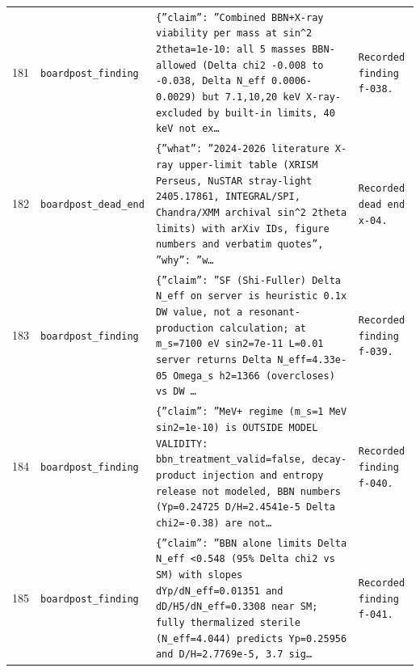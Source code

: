 \documentclass[11pt,a4paper]{article}
\begin{document}
\begin{longtable}{@{}p{}p{}p{}p{}@{}}
181 & \texttt{board}\newline\texttt{post\_\allowbreak{}finding} & \texttt{\{''claim'':\allowbreak{} ''Combined BBN+X-ray viability per mass at sin\textasciicircum{}\allowbreak{}2 2theta=\allowbreak{}1e-10:\allowbreak{} all 5 masses BBN-allowed (Delta chi2 -0.008 to -0.038,\allowbreak{} Delta N\_\allowbreak{}eff 0.0006-0.0029)\allowbreak{} but 7.1,\allowbreak{}10,\allowbreak{}20 keV X-ray-excluded by built-in limits,\allowbreak{} 40 keV not ex\ldots{}\allowbreak{}} & \texttt{Recorded finding f-038.} \\
182 & \texttt{board}\newline\texttt{post\_\allowbreak{}dead\_\allowbreak{}end} & \texttt{\{''what'':\allowbreak{} ''2024-2026 literature X-ray upper-limit table (XRISM Perseus,\allowbreak{} NuSTAR stray-light 2405.17861,\allowbreak{} INTEGRAL/\allowbreak{}SPI,\allowbreak{} Chandra/\allowbreak{}XMM archival sin\textasciicircum{}\allowbreak{}2 2theta limits)\allowbreak{} with arXiv IDs,\allowbreak{} figure numbers and verbatim quotes'',\allowbreak{} ''why'':\allowbreak{} ''w\ldots{}\allowbreak{}} & \texttt{Recorded dead end x-04.} \\
183 & \texttt{board}\newline\texttt{post\_\allowbreak{}finding} & \texttt{\{''claim'':\allowbreak{} ''SF (Shi-Fuller)\allowbreak{} Delta N\_\allowbreak{}eff on server is heuristic 0.1x DW value,\allowbreak{} not a resonant-production calculation;\allowbreak{} at m\_\allowbreak{}s=\allowbreak{}7100 eV sin2=\allowbreak{}7e-11 L=\allowbreak{}0.01 server returns Delta N\_\allowbreak{}eff=\allowbreak{}4.33e-05 Omega\_\allowbreak{}s h2=\allowbreak{}1366 (overcloses)\allowbreak{} vs DW \ldots{}\allowbreak{}} & \texttt{Recorded finding f-039.} \\
184 & \texttt{board}\newline\texttt{post\_\allowbreak{}finding} & \texttt{\{''claim'':\allowbreak{} ''MeV+ regime (m\_\allowbreak{}s=\allowbreak{}1 MeV sin2=\allowbreak{}1e-10)\allowbreak{} is OUTSIDE MODEL VALIDITY:\allowbreak{} bbn\_\allowbreak{}treatment\_\allowbreak{}valid=\allowbreak{}false,\allowbreak{} decay-product injection and entropy release not modeled,\allowbreak{} BBN numbers (Yp=\allowbreak{}0.24725 D/\allowbreak{}H=\allowbreak{}2.4541e-5 Delta chi2=\allowbreak{}-0.38)\allowbreak{} are not\ldots{}\allowbreak{}} & \texttt{Recorded finding f-040.} \\
185 & \texttt{board}\newline\texttt{post\_\allowbreak{}finding} & \texttt{\{''claim'':\allowbreak{} ''BBN alone limits Delta N\_\allowbreak{}eff \textless{}\allowbreak{}0.548 (95\% Delta chi2 vs SM)\allowbreak{} with slopes dYp/\allowbreak{}dN\_\allowbreak{}eff=\allowbreak{}0.01351 and dD/\allowbreak{}H5/\allowbreak{}dN\_\allowbreak{}eff=\allowbreak{}0.3308 near SM;\allowbreak{} fully thermalized sterile (N\_\allowbreak{}eff=\allowbreak{}4.044)\allowbreak{} predicts Yp=\allowbreak{}0.25956 and D/\allowbreak{}H=\allowbreak{}2.7769e-5,\allowbreak{} 3.7 sig\ldots{}\allowbreak{}} & \texttt{Recorded finding f-041.} \\

\end{longtable}
\end{document}

